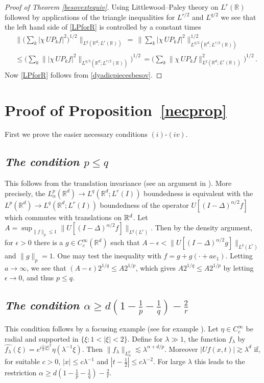 \documentclass[11pt]{amsart}
\theoremstyle{definition}
\numberwithin{theorem}{section}
\numberwithin{definition}{section}
\numberwithin{equation}{section}
\renewcommand{\le}{\leqslant}
\renewcommand{\ge}{\geqslant}
\def\lc{\lesssim}
\def\gc{\gtrsim}
\def\la{\lambda}             \def\La{\Lambda}
\def\bbR{{\mathbb {R}}}
\renewcommand{\le}{\leqslant}
\renewcommand{\ge}{\geqslant}
\begin{document}
\begin{proof}[Proof of Theorem \ref{besovextequiv}]
Using Littlewood--Paley theory on $L^r(\bbR)$  followed by  applications of
the triangle inequa\-lities for  $L^{r/2}$ and  $L^{q/2}$ we see that the left hand side of \eqref{LPforR} is controlled by a constant times
$$\begin{aligned}
&\Big\|\Big( \sum_k | \chi\, UP_k f|^2\Big)^{1/2}\Big\|_{L^{q}(\bbR^{d}; L^{r}(\bbR))}\,=\,\Big\| \sum_k \big| \chi\, UP_k f|^2\Big\|_{L^{q/2}(\bbR^{d}; L^{r/2}(\bbR))}^{1/2}
\\
&\le \Big(\sum_k \big \||\chi \,UP_k f|^2\big\|_{L^{q/2}(\bbR^{d}; L^{r/2}(\bbR))}\Big)^{1/2}\,= \Big(\sum_k \big \|\chi \,UP_k f\big\|_{L^{q}(\bbR^{d}; L^{r}(\bbR))}^2\Big)^{1/2}\,.
\end{aligned}
$$
Now  \eqref{LPforR}
 follows from \eqref{dyadicpiecesbesov}.
\end{proof}




\section{Proof of Proposition~\ref{necprop}}\label{necsect}






First we prove the easier necessary conditions
$(i)$-$(iv)$.

\subsection{\it The condition  $p\le q$} \label{firstneccond}
This  follows from the translation invariance
(see an argument in \cite{hoer1}).
More precisely, the $ L^p_\alpha(\bbR^d)\to L^{q}(\bbR^d;L^r(I))$ boundedness is equivalent
with the
$ L^p(\bbR^d)\to L^{q}(\bbR^d;L^r(I))$ boundedness  of the operator
$U[(I-\Delta)^{\alpha/2} f]$ which commutes with translations on $\Bbb R^d$.
Let
$A=\sup_{\|f\|_p\le 1}\| U[(I-\Delta)^{\alpha/2} f]\|_{L^q(L^r)}.$ Then by the density argument, for $\epsilon>0$  there is a $g\in C_c^\infty (\mathbb R^d)$  such that $A-\epsilon< \| U[(I-\Delta)^{\alpha/2} g]\|_{L^q(L^r)}$ and $\|g\|_p=1$.
One may test the inequality with $f= g+ g(\cdot+a e_1)$. Letting $a\to\infty$, we see that $(A-\epsilon)2^{1/q} \le A 2^{1/p}$, which gives $A2^{1/q} \le A 2^{1/p}$ by letting $\epsilon\to 0$, and thus $p\le q$.


\subsection{\it The condition  $\alpha\ge d(1-\frac 1p-\frac 1q)-\frac 2r$}\label{secondneccond}
 This condition follows by a focusing example (see for example \cite{ro1}). Let $\eta\in C_c^\infty$ be radial and  supported in $\{\xi: 1<|\xi|<2\}$.
Define for $\la\gg1 $, the function $f_\la$ by $\widehat {f_\la}(\xi) =
e^{i\frac{1}{2}|\xi|^2} \eta(\la^{-1}\xi)$. Then $\|f_\la\|_{L^p_\alpha} \lc \la^{\alpha+d/p}$.
  Moreover $|Uf(x,t)|\gc \la^d$
if, for suitable $c>0$,
 $|x|\le c\la^{-1}$ and $|t-\frac{1}{2}|\le c\la^{-2}$.
For large $\la$ this leads to the restriction
 $\alpha\ge d(1-\frac 1p-\frac 1q)-\frac 2r$.
\end{document}
